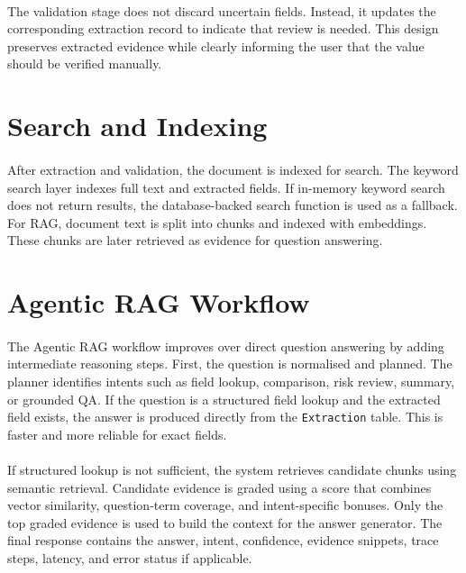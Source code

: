 \paragraph{} The validation stage does not discard uncertain fields. Instead, it updates the corresponding extraction record to indicate that review is needed. This design preserves extracted evidence while clearly informing the user that the value should be verified manually.

\section{Search and Indexing}
\paragraph{} After extraction and validation, the document is indexed for search. The keyword search layer indexes full text and extracted fields. If in-memory keyword search does not return results, the database-backed search function is used as a fallback. For RAG, document text is split into chunks and indexed with embeddings. These chunks are later retrieved as evidence for question answering.

\section{Agentic RAG Workflow}
\paragraph{} The Agentic RAG workflow improves over direct question answering by adding intermediate reasoning steps. First, the question is normalised and planned. The planner identifies intents such as field lookup, comparison, risk review, summary, or grounded QA. If the question is a structured field lookup and the extracted field exists, the answer is produced directly from the \texttt{Extraction} table. This is faster and more reliable for exact fields.

\paragraph{} If structured lookup is not sufficient, the system retrieves candidate chunks using semantic retrieval. Candidate evidence is graded using a score that combines vector similarity, question-term coverage, and intent-specific bonuses. Only the top graded evidence is used to build the context for the answer generator. The final response contains the answer, intent, confidence, evidence snippets, trace steps, latency, and error status if applicable.


